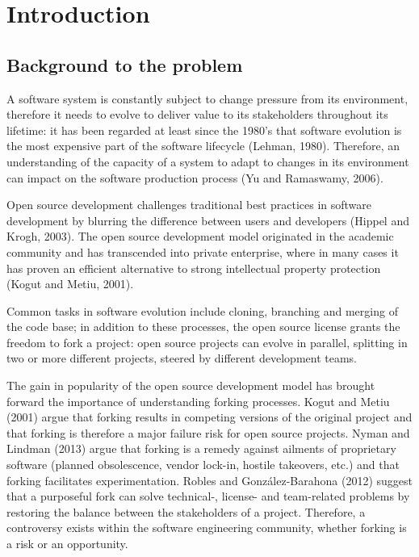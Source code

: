 
\chapter{Introduction} %

\label{Chapter1} %


\section{Background to the problem}
A software system is constantly subject to change pressure from its environment, therefore it needs to evolve to deliver value to its stakeholders throughout its lifetime: it has been regarded at least since the 1980's that software evolution is the most expensive part of the software lifecycle \cite{Lehman1980a}(Lehman, 1980). Therefore, an understanding of the capacity of a system to adapt to changes in its environment can impact on the software production process (Yu and Ramaswamy, 2006).

Open source development challenges traditional best practices in software development by blurring the difference between users and developers (Hippel and Krogh, 2003). The open source development model originated in the academic community and has transcended into private enterprise, where in many cases it has proven an efficient alternative to strong intellectual property protection (Kogut and Metiu, 2001).

Common tasks in software evolution include cloning, branching and merging of the code base; in addition to these processes, the open source license grants the freedom to fork a project: open source projects can evolve in parallel, splitting in two or more different projects, steered by different development teams.

The gain in popularity of the open source development model has brought forward the importance of understanding forking processes. Kogut and Metiu (2001) argue that forking results in competing versions of the original project and that forking is therefore a major failure risk for open source projects. Nyman and Lindman (2013) argue that forking is a remedy against ailments of proprietary software (planned obsolescence, vendor lock-in, hostile takeovers, etc.) and that forking facilitates experimentation. Robles and González-Barahona (2012) suggest that a purposeful fork can solve technical-, license- and team-related problems by restoring the balance between the stakeholders of a project. Therefore, a controversy exists within the software engineering community, whether forking is a risk or an opportunity.

